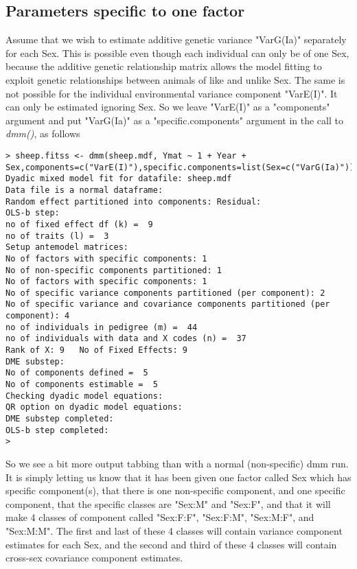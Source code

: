 \documentclass[titlepage]{article}  %
\begin{document}
\subsection{Parameters specific to one factor}

 Assume that we  wish to estimate additive genetic variance "VarG(Ia)" separately for each Sex. This is possible even though each individual can only be of one Sex, because the additive genetic relationship matrix  allows the model fitting to exploit genetic relationships between animals of like and unlike Sex. 
The same is not possible for the individual environmental variance component "VarE(I)". It can only be estimated ignoring Sex. So we leave "VarE(I)" as a "components" argument and put "VarG(Ia)" as a "specific.components" argument in the call to {\em dmm()}, as follows

\begin{verbatim}
> sheep.fitss <- dmm(sheep.mdf, Ymat ~ 1 + Year + Sex,components=c("VarE(I)"),specific.components=list(Sex=c("VarG(Ia)")))
Dyadic mixed model fit for datafile: sheep.mdf  
Data file is a normal dataframe:
Random effect partitioned into components: Residual:
OLS-b step:
no of fixed effect df (k) =  9 
no of traits (l) =  3 
Setup antemodel matrices:
No of factors with specific components: 1 
No of non-specific components partitioned: 1 
No of factors with specific components: 1 
No of specific variance components partitioned (per component): 2 
No of specific variance and covariance components partitioned (per component): 4 
no of individuals in pedigree (m) =  44 
no of individuals with data and X codes (n) =  37 
Rank of X: 9   No of Fixed Effects: 9 
DME substep:
No of components defined =  5 
No of components estimable =  5 
Checking dyadic model equations:
QR option on dyadic model equations:
DME substep completed:
OLS-b step completed:
> 
\end{verbatim}
So we see a bit more output tabbing than with a normal (non-specific) dmm run. It is simply letting us know that it has been given one factor called Sex which has specific component(s), that there is one non-specific component, and one specific component, that the specific classes are "Sex:M" and "Sex:F", and that it will make 4 classes of component called "Sex:F:F", "Sex:F:M", "Sex:M:F", and  "Sex:M:M". The first and last of these 4 classes will contain variance component  estimates for each Sex, and the second and third of these 4 classes will contain cross-sex covariance component estimates.
\end{document}
